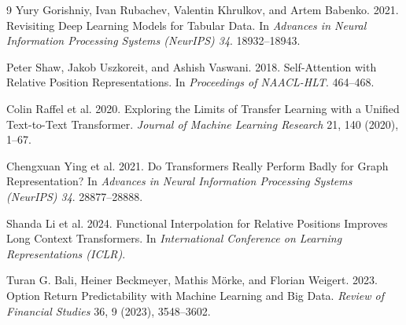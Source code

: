 \documentclass[sigconf,review]{acmart}
\begin{document}
\begin{thebibliography}{9}
Yury Gorishniy, Ivan Rubachev, Valentin Khrulkov, and Artem Babenko. 2021. Revisiting Deep Learning Models for Tabular Data. In \textit{Advances in Neural Information Processing Systems (NeurIPS) 34}. 18932--18943.

Peter Shaw, Jakob Uszkoreit, and Ashish Vaswani. 2018. Self-Attention with Relative Position Representations. In \textit{Proceedings of NAACL-HLT}. 464--468.

Colin Raffel et al. 2020. Exploring the Limits of Transfer Learning with a Unified Text-to-Text Transformer. \textit{Journal of Machine Learning Research} 21, 140 (2020), 1--67.

Chengxuan Ying et al. 2021. Do Transformers Really Perform Badly for Graph Representation? In \textit{Advances in Neural Information Processing Systems (NeurIPS) 34}. 28877--28888.

Shanda Li et al. 2024. Functional Interpolation for Relative Positions Improves Long Context Transformers. In \textit{International Conference on Learning Representations (ICLR)}.

Turan G. Bali, Heiner Beckmeyer, Mathis M\"orke, and Florian Weigert. 2023. Option Return Predictability with Machine Learning and Big Data. \textit{Review of Financial Studies} 36, 9 (2023), 3548--3602.

\end{thebibliography}
\endgroup
\end{document}
